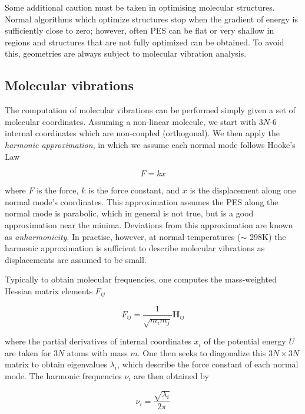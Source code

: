 Some additional caution must be taken in optimising molecular structures. Normal algorithms which optimize structures stop when the gradient of energy is sufficiently close to zero; however, often PES can be flat or very shallow in regions and structures that are not fully optimized can be obtained. To avoid this, geometries are always subject to molecular vibration analysis.

\subsection{Molecular vibrations}

The computation of molecular vibrations can be performed simply given a set of molecular coordinates.\cite{Wilson1980} Assuming a non-linear molecule, we start with 3$N$-6 internal coordinates which are non-coupled (orthogonal). We then apply the \emph{harmonic approximation}, in which we assume each normal mode follows Hooke's Law

\begin{equation}
  F = kx
\end{equation}


\noindent where $F$ is the force, $k$ is the force constant, and $x$ is the displacement along one normal mode's coordinates. This approximation assumes the PES along the normal mode is parabolic, which in general is not true, but is a good approximation near the minima. Deviations from this approximation are known as \emph{anharmonicity}. In practise, however, at normal temperatures ($\sim$ 298K) the harmonic approximation is sufficient to describe molecular vibrations as displacements are assumed to be small.

Typically to obtain molecular frequencies, one computes the mass-weighted Hessian matrix elements $F_{ij}$

\begin{equation}
  F_{ij} = \frac{1}{\sqrt{m_i m_j}} \mathbf{H}_{ij}
\end{equation}

\noindent where the partial derivatives of internal coordinates $x_i$ of the potential energy $U$ are taken for 3$N$ atoms with mass $m$. One then seeks to diagonalize this $3N\times3N$ matrix to obtain eigenvalues $\lambda_i$, which describe the force constant of each normal mode. The harmonic frequencies $\nu_i$ are then obtained by

\begin{equation}
  \nu_i = \frac{\sqrt{\lambda_i}}{2\pi}
\end{equation}

